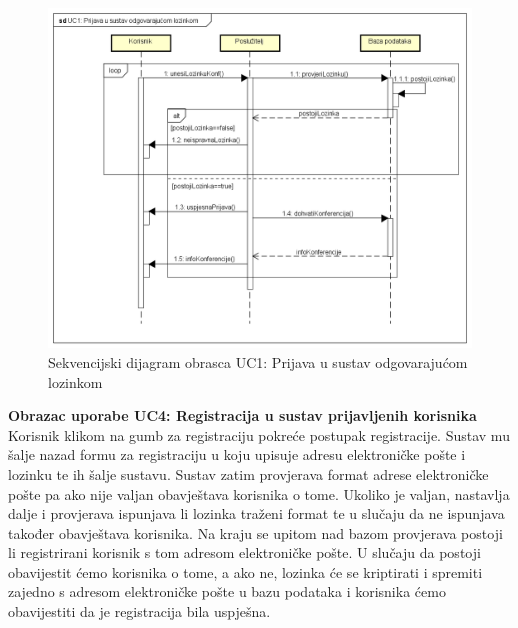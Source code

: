 				\begin{figure}[H]
					\includegraphics[width=\textwidth]{slike/uc1Sekvencijski.PNG} %
					\caption{Sekvencijski dijagram obrasca UC1: Prijava u sustav odgovarajućom lozinkom}
					\label{fig:uc1-sekvencijski} %
				\end{figure}
				\eject
					\textbf{Obrazac uporabe UC4: Registracija u sustav prijavljenih korisnika}\\
				Korisnik klikom na gumb za registraciju pokreće postupak registracije. Sustav mu šalje nazad formu za registraciju u koju upisuje adresu elektroničke pošte i lozinku te ih šalje sustavu. Sustav zatim provjerava format adrese elektroničke pošte pa ako nije valjan obavještava korisnika o tome. Ukoliko je valjan, nastavlja dalje i provjerava ispunjava li lozinka traženi format te u slučaju da ne ispunjava također obavještava korisnika. Na kraju se upitom nad bazom provjerava postoji li registrirani korisnik s tom adresom elektroničke pošte. U slučaju da postoji obavijestit ćemo korisnika o tome, a ako ne, lozinka će se kriptirati i spremiti zajedno s adresom elektroničke pošte u bazu podataka i korisnika ćemo obavijestiti da je registracija bila uspješna.

